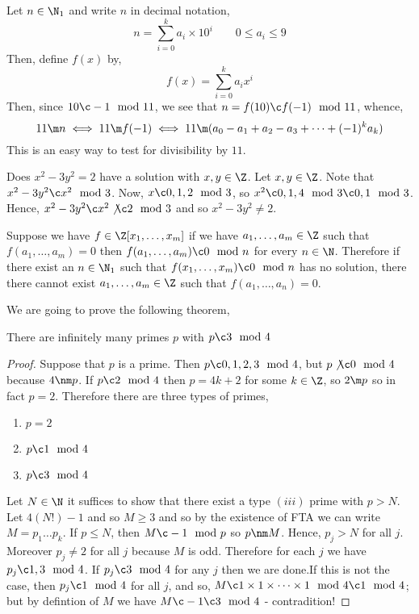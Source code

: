 \begin{eg}
  Let $n \in \N_1$ and write $n$ in decimal notation,
  $$ n = \sum_{i=0}^k a_i \times 10^i \qquad 0 \le a_i \le 9$$
  Then, define $f(x)$ by,
  $$ f(x) = \sum_{i=0}^k a_i x^i $$
  Then, since $10 \c -1\mod 11$, we see that $n = f(10) \c f(-1)\mod 11$, whence,
  $$ 11 \m n \iff 11 \m f(-1) \iff 11 \m (a_0 - a_1 + a_2 - a_3 + \dots + (-1)^k a_k) $$
  This is an easy way to test for divisibility by $11$.
\end{eg}

\begin{eg}
  Does $x^2 - 3y^2 = 2$ have a solution with $x, y \in \Z$. Let $x, y \in \Z$. Note that $x^2 - 3y^2 \c x^2 \mod 3$. Now, $x \c 0, 1, 2 \mod 3$, so $x^2 \c 0, 1, 4\mod 3 \c 0, 1\mod 3$. Hence, $x^2 - 3y^2 \c x^2 \not\c 2 \mod 3$ and so $x^2 - 3y^2 \ne 2$.
\end{eg}

\begin{remark}
  Suppose we have $f \in \Z[x_1, \dots, x_m]$ if we have $a_1, \dots, a_m \in \Z$ such that $f(a_1, \dots, a_m) = 0$ then $f(a_1, \dots, a_m) \c 0 \mod n$ for every $n \in \N$. Therefore if there exist an $n \in \N_1$ such that $f(x_1, \dots, x_m) \c 0 \mod n$ has no solution, there there cannot exist $a_1, \dots, a_m \in \Z$ such that $f(a_1, \dots, a_n) = 0$.
\end{remark}

We are going to prove the following theorem,
\begin{nthm}
  There are infinitely many primes $p$ with $p \c 3\mod 4$
\end{nthm}
\begin{proof}
  Suppose that $p$ is a prime. Then $p \c 0, 1, 2, 3 \mod 4$, but $p \not\c 0 \mod 4$ because $4 \nm p$. If $p \c 2 \mod 4$ then $p = 4k + 2$ for some $k \in \Z$, so $2 \m p$ so in fact $p = 2$. Therefore there are three types of primes,
  \begin{enumerate}
    \item $p = 2$
    \item $p \c 1 \mod 4$
    \item $p \c 3 \mod 4$
  \end{enumerate}
  Let $N \in \N$ it suffices to show that there exist a type $(iii)$ prime with $p > N$. Let $4(N!) - 1$ and so $M \ge 3$ and so by the existence of FTA we can write $M = p_1\dots p_k$. If $p \le N$, then $M \c -1 \mod p$ so $p \nm M$. Hence, $p_j > N$ for all $j$. Moreover $p_j \ne 2$ for all $j$ because $M$ is odd. Therefore for each $j$ we have $p_j \c 1, 3 \mod 4$. If $p_j \c 3\mod 4$ for any $j$ then we are done.If this is not the case, then $p_j \c 1 \mod 4$ for all $j$, and so, $M \c 1 \times 1 \times \dots \times 1 \mod 4 \c 1 \mod 4$; but by defintion of $M$ we have $M \c -1 \c 3 \mod 4$ - contradition!
\end{proof}

